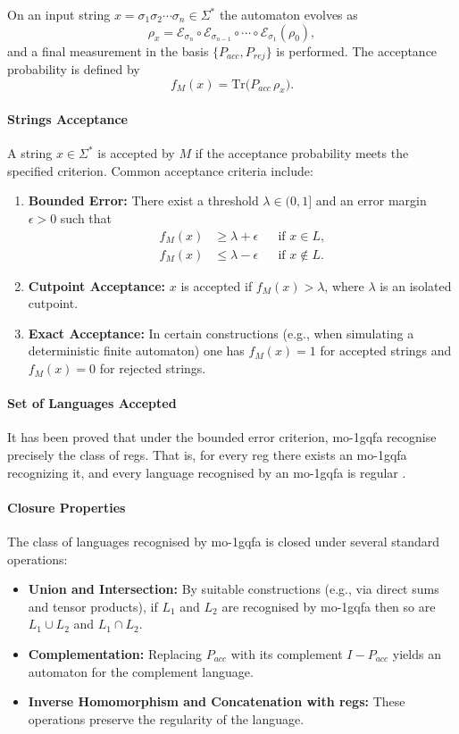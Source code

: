 On an input string $x=\sigma_1\sigma_2\cdots\sigma_n\in\Sigma^*$ the automaton evolves as
\[
\rho_x = \mathcal{E}_{\sigma_n}\circ \mathcal{E}_{\sigma_{n-1}}\circ\cdots\circ \mathcal{E}_{\sigma_1}(\rho_0),
\]
and a final measurement in the basis $\{P_{acc},P_{rej}\}$ is performed. The acceptance probability is defined by
\[
f_M(x)=\mathrm{Tr}\bigl(P_{acc}\,\rho_x\bigr).
\]

\paragraph{Strings Acceptance} 
A string $x\in\Sigma^*$ is accepted by $M$ if the acceptance probability meets the specified criterion. Common acceptance criteria include:
\begin{enumerate}
  \item \textbf{Bounded Error:} There exist a threshold $\lambda\in(0,1]$ and an error margin $\epsilon>0$ such that
  \[
  \begin{aligned}
  f_M(x) &\ge \lambda+\epsilon &&\text{if } x\in L,\\[1mm]
  f_M(x) &\le \lambda-\epsilon &&\text{if } x\notin L.
  \end{aligned}
  \]
  \item \textbf{Cutpoint Acceptance:} $x$ is accepted if $f_M(x)>\lambda$, where $\lambda$ is an isolated cutpoint.
  \item \textbf{Exact Acceptance:} In certain constructions (e.g., when simulating a deterministic finite automaton) one has $f_M(x)=1$ for accepted strings and $f_M(x)=0$ for rejected strings.
\end{enumerate}

\paragraph{Set of Languages Accepted}  
It has been proved that under the bounded error criterion, \gls{mo-1gqfa} recognise precisely the class of \glspl{reg}. That is, for every \gls{reg} there exists an \gls{mo-1gqfa} recognizing it, and every language recognised by an \gls{mo-1gqfa} is regular \cite{li2012characterizations}.

\paragraph{Closure Properties}  
The class of languages recognised by \gls{mo-1gqfa} is closed under several standard operations:
\begin{itemize}
  \item \textbf{Union and Intersection:} By suitable constructions (e.g., via direct sums and tensor products), if $L_1$ and $L_2$ are recognised by \gls{mo-1gqfa} then so are $L_1\cup L_2$ and $L_1\cap L_2$.
  \item \textbf{Complementation:} Replacing $P_{acc}$ with its complement $I-P_{acc}$ yields an automaton for the complement language.
  \item \textbf{Inverse Homomorphism and Concatenation with \glspl{reg}:} These operations preserve the regularity of the language.
\end{itemize}

